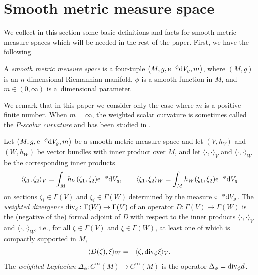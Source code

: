 \documentclass[pdftex]{sigma}
\numberwithin{equation}{section}
\begin{document}
\section{Smooth metric measure space}

We collect in this section some basic definitions and facts for smooth metric measure spaces
which will be needed in the rest of the paper.
First, we have the following.

\begin{Definition}
 A \textit{smooth metric measure space} is a four-tuple $\bigl(M,g,{\rm e}^{-\phi}{\rm d}V_g,m\bigr)$,
 where $(M,g)$ is an $n$-dimensional Riemannian manifold, $\phi$ is a smooth function in $M$, and $m\in(0,\infty)$ is a~dimensional parameter.
\end{Definition}

We remark that in this paper we consider only the case where $m$ is a positive finite number. When $m=\infty$, the weighted scalar curvature is sometimes called the \textit{$P$-scalar curvature} and has been studied in \cite{Abedin&Corvino}.

\begin{Definition}
 Let $\bigl(M,g,{\rm e}^{-\phi}{\rm d}V_g,m\bigr)$ be a smooth metric measure space and let $(V,h_V)$ and $(W,h_W)$ be vector bundles with inner product over $M$, and let $\langle\cdot,\cdot\rangle_V$ and $\langle \cdot,\cdot\rangle_W$ be the corresponding inner products
 \begin{equation*}
 \langle \zeta_1,\zeta_2\rangle_V=\int_M h_V(\zeta_1,\zeta_2){\rm e}^{-\phi}{\rm d}V_g,\qquad
 \langle \xi_1,\xi_2\rangle_W=\int_M h_W(\xi_1,\xi_2){\rm e}^{-\phi}{\rm d}V_g
 \end{equation*}
 on sections $\zeta_i\in \Gamma(V)$ and $\xi_i\in\Gamma(W)$ determined by the measure ${\rm e}^{-\phi}{\rm d}V_g$. The \textit{weighted divergence} ${\rm div}_\phi\colon\Gamma(W)\to \Gamma(V)$ of an operator $D\colon\Gamma(V)\to \Gamma(W)$ is the (negative of the) formal adjoint of $D$ with respect to the inner products $\langle\cdot,\cdot\rangle_V$ and $\langle\cdot,\cdot\rangle_W$, i.e., for all $\zeta\in \Gamma(V)$ and $\xi\in \Gamma(W)$, at least one of which is compactly supported in $M$,
 \begin{equation*}
 \langle D(\zeta),\xi\rangle_W=-\langle \zeta,{\rm div}_\phi\xi\rangle_V.
 \end{equation*}
 The \textit{weighted Laplacian} $\Delta_\phi\colon C^\infty(M)\to C^\infty(M)$ is the operator $\Delta_\phi={\rm div}_\phi d$.
\end{Definition}
\end{document}
